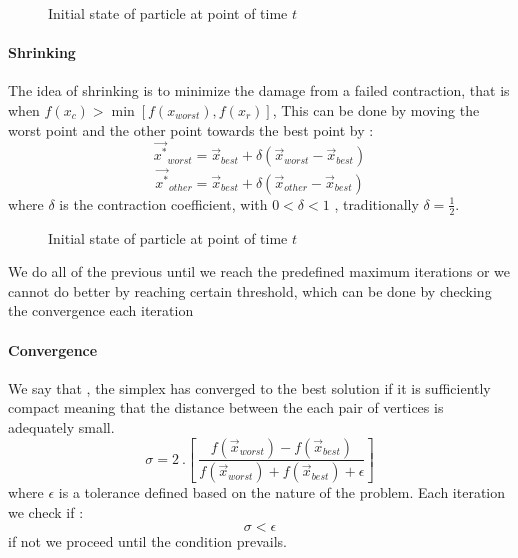     \begin{figure}[htbp]
        \centering
        \scalebox{1.1}{}
        \caption{Initial state of particle at point of time $t$ }
        \label{fig:label}
    \end{figure}


\paragraph{Shrinking}

The idea of shrinking is to minimize the damage from a failed
contraction, that is when
{\(f(x_{c}) > \min\left\lbrack f(x_{worst}),f(x_{r}) \right\rbrack\)},
This can be done by moving the worst point and the other point towards
the best point by :\\
{\[{\overset{\rightarrow}{x^{\ast}}}_{worst} = {\overset{\rightarrow}{x}}_{best} + \delta({\overset{\rightarrow}{x}}_{worst} - {\overset{\rightarrow}{x}}_{best})\]}{\[{\overset{\rightarrow}{x^{\ast}}}_{other} = {\overset{\rightarrow}{x}}_{best} + \delta({\overset{\rightarrow}{x}}_{other} - {\overset{\rightarrow}{x}}_{best})\]}where
{\(\delta\)} is the contraction coefficient, with {\(0 < \delta < 1\)} ,
traditionally {\(\delta = \frac{1}{2}\)}.

    \begin{figure}[htbp]
        \centering
        \scalebox{1.1}{}
        \caption{Initial state of particle at point of time $t$ }
        \label{fig:label}
    \end{figure}


We do all of the previous until we reach the predefined maximum
iterations or we cannot do better by reaching certain threshold, which
can be done by checking the convergence each iteration


\paragraph{Convergence}

We say that , the simplex has converged to the best solution if it is
sufficiently compact meaning that the distance between the each pair of
vertices is adequately small.\\
{\[\sigma = 2\ .\left\lbrack \ \frac{f({\overset{\rightarrow}{x}}_{worst}) - f({\overset{\rightarrow}{x}}_{best})}{f({\overset{\rightarrow}{x}}_{worst}) + f({\overset{\rightarrow}{x}}_{best}) + \epsilon} \right\rbrack\]}where
{\(\epsilon\)} is a tolerance defined based on the nature of the
problem. Each iteration we check if :\\
{\[\sigma < \epsilon\]}if not we proceed until the condition prevails.

